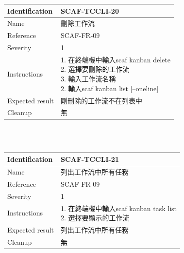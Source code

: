 \documentclass{report}
\begin{document}
\begin{tabularx}{\textwidth}{
  |p{}%
  |p{}|%
  }
  \hline
  \centering Identification &  SCAF-TCCLI-20 \\
  \hline
  \centering Name & 刪除工作流 \\
  \hline
  \centering Reference & SCAF-FR-09 \\
  \hline
  \centering Severity & 1 \\
  \hline
  \centering Instructions & 
  \makecell[l]{
    1. 在終端機中輸入scaf kanban delete \\
    2. 選擇要刪除的工作流 \\
    3. 輸入工作流名稱 \\
    2. 輸入scaf kanban list [--oneline] \\
  }\\
  \hline
  \centering Expected result & 剛刪除的工作流不在列表中 \\
  \hline
  \centering Cleanup & 無 \\
  \hline
\end{tabularx}
\\
\newline
\\

\begin{tabularx}{\textwidth}{
  |p{}%
  |p{}|%
  }
  \hline
  \centering Identification &  SCAF-TCCLI-21 \\
  \hline
  \centering Name & 列出工作流中所有任務 \\
  \hline
  \centering Reference & SCAF-FR-09 \\
  \hline
  \centering Severity & 1 \\
  \hline
  \centering Instructions & 
  \makecell[l]{
    1. 在終端機中輸入scaf kanban task list \\
    2. 選擇要顯示的工作流 \\
  }\\
  \hline
  \centering Expected result & 列出工作流中所有任務 \\
  \hline
  \centering Cleanup & 無 \\
  \hline
\end{tabularx}
\\
\newline
\\
\end{document}
